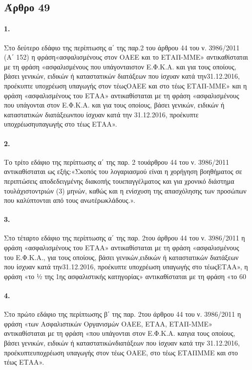 \documentclass[a4paper,oneside, 10pt]{book}
\begin{document}
\subsection*{ Άρθρο 49 }
\paragraph { 1. } Στο δεύτερο εδάφιο της περίπτωσης α΄ της παρ.2 του άρθρου 44 του ν. 3986/2011 (Α΄ 152) η φράση«ασφαλισμένους στον ΟΑΕΕ και το ΕΤΑΠ-ΜΜΕ» αντικαθίσταται με τη φράση «ασφαλισμένους που υπάγονταιστον Ε.Φ.Κ.Α. και για τους οποίους, βάσει γενικών, ειδικών ή καταστατικών διατάξεων που ίσχυαν κατά την31.12.2016, προέκυπτε υποχρέωση υπαγωγής στον τέωςΟΑΕΕ και στο τέως ΕΤΑΠ-ΜΜΕ» και η φράση «ασφαλισμένους του ΕΤΑΑ» αντικαθίσταται με τη φράση «ασφαλισμένους που υπάγονται στον Ε.Φ.Κ.Α. και για τους οποίους, βάσει γενικών, ειδικών ή καταστατικών διατάξεωνπου ίσχυαν κατά την 31.12.2016, προέκυπτε υποχρέωσηυπαγωγής στο τέως ΕΤΑΑ».
\paragraph { 2. } Το τρίτο εδάφιο της περίπτωσης α΄ της παρ. 2 τουάρθρου 44 του ν. 3986/2011 αντικαθίσταται ως εξής:«Σκοπός του λογαριασμού είναι η χορήγηση βοηθήματος σε περιπτώσεις αποδεδειγμένης διακοπής τουεπαγγέλματος και για χρονικό διάστημα τουλάχιστοντριών (3) μηνών, καθώς και η ενίσχυση της απασχόλησης των προσώπων που καλύπτονται από τους ανωτέρωκλάδους.».
\paragraph { 3. } Στο τέταρτο εδάφιο της περίπτωσης α΄ της παρ. 2του άρθρου 44 του ν. 3986/2011 η φράση «ασφαλισμένους του ΕΤΑΑ» αντικαθίσταται με τη φράση «ασφαλισμένους του Ε.Φ.Κ.Α., για τους οποίους, βάσει γενικών,ειδικών ή καταστατικών διατάξεων που ίσχυαν κατά την31.12.2016, προέκυπτε υποχρέωση υπαγωγής στο τέωςΕΤΑΑ», η φράση «το ½ της 1ης ασφαλιστικής κατηγορίας» αντικαθίσταται με τη φράση «το 60%
\paragraph { 4. } Στο πρώτο εδάφιο της περίπτωσης β΄ της παρ. 2του άρθρου 44 του ν. 3986/2011 η φράση «των Ασφαλιστικών Οργανισμών ΟΑΕΕ, ΕΤΑΑ, ΕΤΑΠ-ΜΜΕ» αντικαθίσταται με τη φράση «που υπάγονται στον Ε.Φ.Κ.Α. καιγια τους οποίους, βάσει γενικών, ειδικών ή καταστατικώνδιατάξεων που ίσχυαν κατά την 31.12.2016, προέκυπτευποχρέωση υπαγωγής στον τέως ΟΑΕΕ, στο τέως ΕΤΑΠΜΜΕ και στο τέως ΕΤΑΑ».
\end{document}
